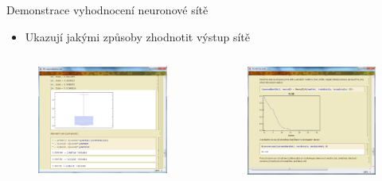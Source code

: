 \documentclass{beamer}
\begin{document}
\begin{frame}{Demonstrace vyhodnocení neuronové sítě}
\begin{itemize}
\item Ukazují jakými způsoby zhodnotit výstup sítě
\end{itemize} 
  \begin{columns}[T]
    \column{5cm}
      \begin{figure}
   \includegraphics[width=5.5cm]{uk5.png}
\end{figure}
    \column{5cm}
      \begin{figure}
   \includegraphics[width=5.5cm]{uk6.png}
\end{figure}
  \end{columns}
\end{frame}
\end{document}
